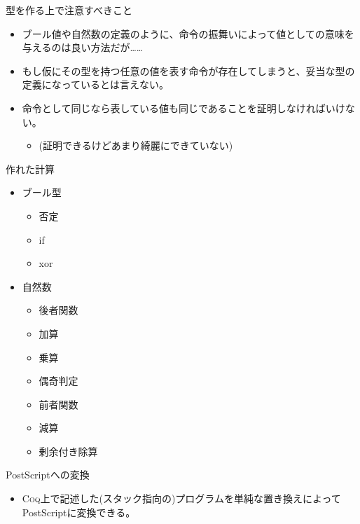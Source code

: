\documentclass[cjk, 14pt]{beamer}
\newcommand{\Coq}{{\scshape{}Coq}}
\begin{document}
\begin{frame}{型を作る上で注意すべきこと}

  \begin{itemize}
    \item ブール値や自然数の定義のように、命令の振舞いによって値としての意味を与えるのは良い方法だが……
    \item もし仮にその型を持つ任意の値を表す命令が存在してしまうと、妥当な型の定義になっているとは言えない。
    \item 命令として同じなら表している値も同じであることを証明しなければいけない。
    \begin{itemize}
      \item (証明できるけどあまり綺麗にできていない)
    \end{itemize}
  \end{itemize}

\end{frame}

\begin{frame}{作れた計算}

  \begin{itemize}
    \item ブール型
    \begin{itemize}
      \item 否定
      \item if
      \item xor
    \end{itemize}
    \item 自然数
    \begin{itemize}
      \item 後者関数
      \item 加算
      \item 乗算
      \item 偶奇判定
      \item 前者関数
      \item 減算
      \item 剰余付き除算
    \end{itemize}
  \end{itemize}

\end{frame}

\begin{frame}{PostScriptへの変換}

  \begin{itemize}
    \item \Coq{}上で記述した(スタック指向の)プログラムを単純な置き換えによってPostScriptに変換できる。
  \end{itemize}

\end{frame}
\end{document}
